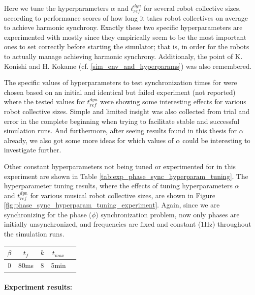 		Here we tune the hyperparameters $\alpha$ and $t_{ref}^{dyn}$ for several robot collective sizes, according to performance scores of how long it takes robot collectives on average to achieve harmonic synchrony. Exactly these two specific hyperparameters are experimented with mostly since they empirically seem to be the most important ones to set correctly before starting the simulator; that is, in order for the robots to actually manage achieving harmonic synchrony. Additionaly, the point of K. Konishi and H. Kokame (cf. \ref{sim_env_and_hyperparams}) was also remembered.
		
		The specific values of hyperparameters to test synchronization times for were chosen based on an initial and identical but failed experiment (not reported) where the tested values for $t_{ref}^{dyn}$ were showing some interesting effects for various robot collective sizes. Simple and limited insight was also collected from trial and error in the complete beginning when trying to facilitate stable and successful simulation runs. And furthermore, after seeing results found in this thesis for $\alpha$ already, we also got some more ideas for which values of $\alpha$ could be interesting to investigate further.
		
		Other constant hyperparameters not being tuned or experimented for in this experiment are shown in Table \ref{tab:exp_phase_sync_hyperparam_tuning}. The hyperparameter tuning results, where the effects of tuning hyperparameters $\alpha$ and $t_{ref}^{dyn}$ for various musical robot collective sizes, are shown in Figure \ref{fig:phase_sync_hyperparam_tuning_experiment}. Again, since we are synchronizing for the phase ($\phi$) synchronization problem, now only phases are initially unsynchronized, and frequencies are fixed and constant (1Hz) throughout the simulation runs.
		
		\begin{center}
		\begin{tabular}{ |c|c|c|c|c| } 
		\hline
		$\beta$ & $t_f$ & $k$ & $t_{max}$ \\
		\hline
		0 & 80ms & 8 & 5min \\
		\hline
		\end{tabular}
		\label{tab:exp_phase_sync_hyperparam_tuning}
		\end{center}
		
		\paragraph{Experiment results:\nl}
		
